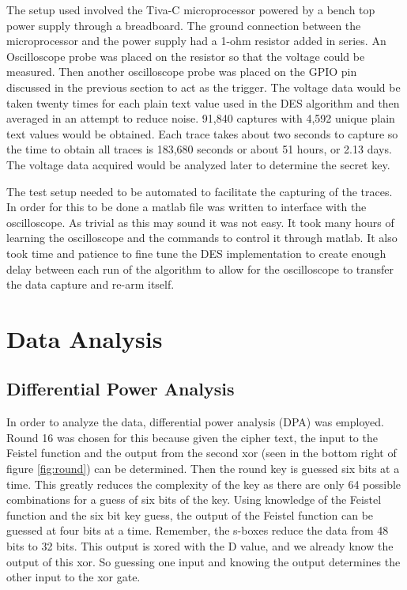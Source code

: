 	The setup used involved the Tiva-C microprocessor powered by a bench top power supply through a breadboard.  The ground connection between the microprocessor and the power supply had a 1-ohm resistor added in series.  An Oscilloscope probe was placed on the resistor so that the voltage could be measured.  Then another oscilloscope probe was placed on the GPIO pin discussed in the previous section to act as the trigger.  The voltage data would be taken twenty times for each plain text value used in the DES algorithm and then averaged in an attempt to reduce noise.  91,840 captures with 4,592 unique plain text values would be obtained.  Each trace takes about two seconds to capture so the time to obtain all traces is 183,680 seconds or about 51 hours, or 2.13 days.  The voltage data acquired would be analyzed later to determine the secret key.
	
	The test setup needed to be automated to facilitate the capturing of the traces.  In order for this to be done a matlab file was written to interface with the oscilloscope.  As trivial as this may sound it was not easy.  It took many hours of learning the oscilloscope and the commands to control it through matlab.  It also took time and patience to fine tune the DES implementation to create enough delay between each run of the algorithm to allow for the oscilloscope to transfer the data capture and re-arm itself.
	

\section{Data Analysis}\label{sec::analysis} 
\subsection{Differential Power Analysis}
	In order to analyze the data, differential power analysis (DPA) was employed.  Round 16 was chosen for this because given the cipher text, the input to the Feistel  function and the output from the second xor (seen in the bottom right of figure \ref{fig:round}) can be determined.  Then the round key is guessed six bits at a time.  This greatly reduces the complexity of the key as there are only 64 possible combinations for a guess of six bits of the key.  Using knowledge of the Feistel function and the six bit key guess, the output of the Feistel function can be guessed at four bits at a time.  Remember, the s-boxes reduce the data from 48 bits to 32 bits.  This output is xored with the D value, and we already know the output of this xor.  So guessing one input and knowing the output determines the other input to the xor gate.  
	

